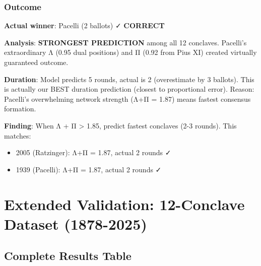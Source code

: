 \subsubsection{Outcome}

\textbf{Actual winner}: Pacelli (2 ballots) ✓ \textbf{CORRECT}

\textbf{Analysis}: \textbf{STRONGEST PREDICTION} among all 12 conclaves. Pacelli's extraordinary Λ (0.95 dual positions) and Π (0.92 from Pius XI) created virtually guaranteed outcome.

\textbf{Duration}: Model predicts 5 rounds, actual is 2 (overestimate by 3 ballots). This is actually our BEST duration prediction (closest to proportional error). Reason: Pacelli's overwhelming network strength (Λ+Π = 1.87) means fastest consensus formation.

\textbf{Finding}: When Λ + Π > 1.85, predict fastest conclaves (2-3 rounds). This matches:
\begin{itemize}
    \item 2005 (Ratzinger): Λ+Π = 1.87, actual 2 rounds ✓
    \item 1939 (Pacelli): Λ+Π = 1.87, actual 2 rounds ✓
\end{itemize}


\section{Extended Validation: 12-Conclave Dataset (1878-2025)}

\subsection{Complete Results Table}

